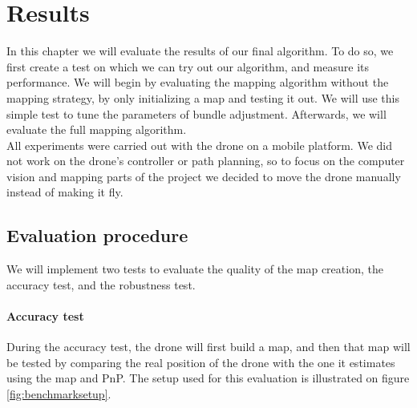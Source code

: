 \chapter{Results} \label{chpt:results}
In this chapter we will evaluate the results of our final algorithm. To do so, we first create a test on which we can try out our algorithm, and measure its performance. We will begin by evaluating the mapping algorithm without the mapping strategy, by only initializing a map and testing it out. We will use this simple test to tune the parameters of bundle adjustment. Afterwards, we will evaluate the full mapping algorithm.\\

All experiments were carried out with the drone on a mobile platform. We did not work on the drone's controller or path planning, so to focus on the computer vision and mapping parts of the project we decided to move the drone manually instead of making it fly. 

\section{Evaluation procedure} \label{evalproc}
We will implement two tests to evaluate the quality of the map creation, the accuracy test, and the robustness test.\\

\subsubsection{Accuracy test}
During the accuracy test, the drone will first build a map, and then that map will be tested by comparing the real position of the drone with the one it estimates using the map and PnP. The setup used for this evaluation is illustrated on figure \ref{fig:benchmarksetup}.\\

